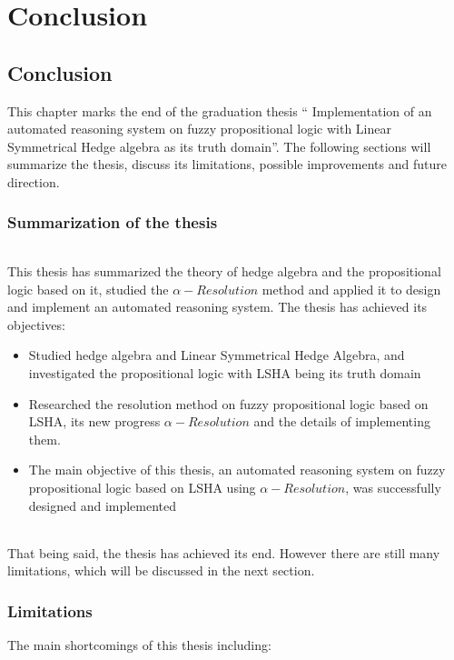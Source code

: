 \documentclass[../gr-final.tex]{subfiles}
\begin{document}
\part{Conclusion}
\chapter{Conclusion}
This chapter marks the end of the graduation thesis ``
Implementation of an automated reasoning system on fuzzy
propositional logic with Linear Symmetrical Hedge algebra as its
truth domain''. The following sections will summarize the thesis,
discuss its limitations, possible improvements and future
direction.
\section{Summarization of the thesis}
\paragraph{} This thesis has summarized the theory of hedge
algebra and the propositional logic based on it, studied the
$\alpha-Resolution$ method and applied it to design and implement
an automated reasoning system. The thesis has achieved its
objectives:
\begin{itemize}
        \item Studied hedge algebra and Linear Symmetrical Hedge Algebra,
                and investigated the propositional logic with
                LSHA being its truth domain
        \item Researched the resolution method on fuzzy
                propositional logic based on LSHA, its new
                progress $\alpha-Resolution$ and the details of
                implementing them.
        \item The main objective of this thesis, an automated
                reasoning system on fuzzy propositional logic
                based on LSHA using $\alpha-Resolution$, was 
                successfully designed and implemented     
\end{itemize}
\paragraph{} That being said, the thesis has achieved its end.
However there are still many limitations, which will be discussed
in the next section.
\section{Limitations}
The main shortcomings of this thesis including:
\end{document}
